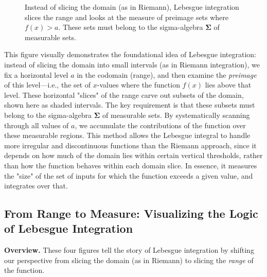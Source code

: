 \begin{figure}[H]
\caption{Instead of slicing the domain (as in Riemann), Lebesgue integration slices the range and looks at the measure of preimage sets where \( f(x) > a \). These sets must belong to the sigma-algebra \( \boldsymbol{\Sigma} \) of measurable sets.}
\end{figure}


This figure visually demonstrates the foundational idea of Lebesgue integration: instead of slicing the domain into small intervals (as in Riemann integration), we fix a horizontal level \( a \) in the codomain (range), and then examine the \emph{preimage} of this level—i.e., the set of \( x \)-values where the function \( f(x) \) lies above that level. These horizontal "slices" of the range carve out subsets of the domain, shown here as shaded intervals. The key requirement is that these subsets must belong to the sigma-algebra \( \boldsymbol{\Sigma} \) of measurable sets. By systematically scanning through all values of \( a \), we accumulate the contributions of the function over these measurable regions. This method allows the Lebesgue integral to handle more irregular and discontinuous functions than the Riemann approach, since it depends on how much of the domain lies within certain vertical thresholds, rather than how the function behaves within each domain slice. In essence, it measures the "size" of the set of inputs for which the function exceeds a given value, and integrates over that.



\subsection{From Range to Measure: Visualizing the Logic of Lebesgue Integration}

\textbf{Overview.} These four figures tell the story of Lebesgue integration by shifting our perspective from slicing the domain (as in Riemann) to slicing the \emph{range} of the function.

